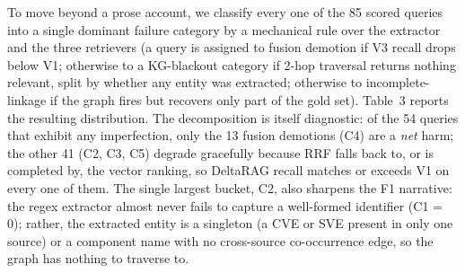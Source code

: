 \documentclass[
]{article}
\begin{document}
To move beyond a prose account, we classify every one of the 85 scored
queries into a single dominant failure category by a mechanical rule over
the extractor and the three retrievers (a query is assigned to fusion
demotion if V3 recall drops below V1; otherwise to a KG-blackout category
if 2-hop traversal returns nothing relevant, split by whether any entity
was extracted; otherwise to incomplete-linkage if the graph fires but
recovers only part of the gold set). Table~3 reports the resulting
distribution. The decomposition is itself diagnostic: of the 54 queries
that exhibit any imperfection, only the 13 fusion demotions (C4) are a
\emph{net} harm; the other 41 (C2, C3, C5) degrade gracefully because RRF
falls back to, or is completed by, the vector ranking, so DeltaRAG recall
matches or exceeds V1 on every one of them. The single largest bucket,
C2, also sharpens the F1 narrative: the regex extractor almost never fails
to capture a well-formed identifier (C1 = 0); rather, the extracted entity
is a singleton (a CVE or SVE present in only one source) or a component
name with no cross-source co-occurrence edge, so the graph has nothing to
traverse to.
\end{document}
